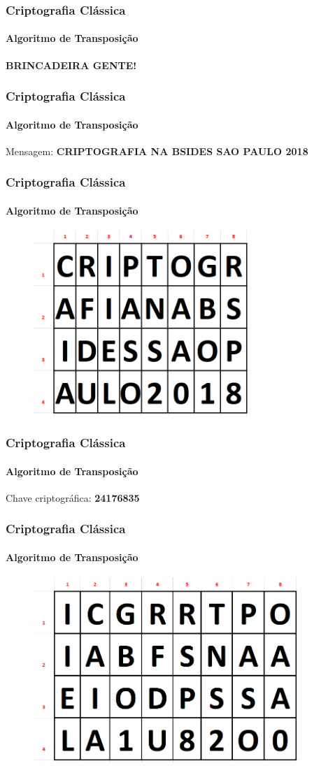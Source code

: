 \documentclass[compress]{beamer}
\begin{document}
\begin{frame}
\frametitle{Criptografia Clássica}
\framesubtitle{Algoritmo de Transposição}
\centering
\textbf{{\LARGE BRINCADEIRA GENTE!}}
\end{frame}

\begin{frame}
\frametitle{Criptografia Clássica}
\framesubtitle{Algoritmo de Transposição}
\centering
Mensagem: \textbf{CRIPTOGRAFIA NA BSIDES SAO PAULO 2018}
\end{frame}

\begin{frame}
\frametitle{Criptografia Clássica}
\framesubtitle{Algoritmo de Transposição}
	\begin{figure}[h]
		\includegraphics[width=\textwidth,height=7cm]{pics/tab_trans_1}
	\end{figure}
\end{frame}

\begin{frame}
\frametitle{Criptografia Clássica}
\framesubtitle{Algoritmo de Transposição}
\centering
Chave criptográfica: \textbf{24176835}
\end{frame}

\begin{frame}
\frametitle{Criptografia Clássica}
\framesubtitle{Algoritmo de Transposição}
\begin{figure}[h]
	\includegraphics[width=\textwidth,height=7cm]{pics/tab_trans_2}
\end{figure}
\end{frame}
\end{document}
